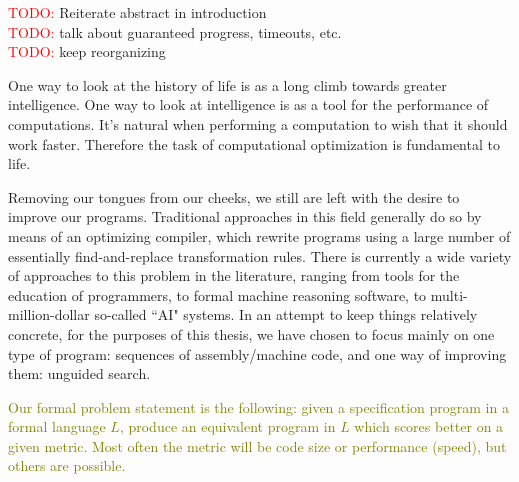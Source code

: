 \documentclass[12pt,twoside]{reedthesis}
\newcommand{\red}[1]{\textcolor{red}{#1}}
\newcommand{\green}[1]{\textcolor{olive}{#1}}
\begin{document}
        \red{TODO:} Reiterate abstract in introduction
     \\ \red{TODO:} talk about guaranteed progress, timeouts, etc.
     \\ \red{TODO:} keep reorganizing
    
    One way to look at the history of life is as a long climb towards greater intelligence.
    One way to look at intelligence is as a tool for the performance of computations.
    It's natural when performing a computation to wish that it should work faster.
    Therefore the task of computational optimization is fundamental to life.
    
    Removing our tongues from our cheeks, we still are left with the desire to improve our programs. 
    Traditional approaches in this field generally do so by means of an optimizing compiler, which rewrite programs using a large number of essentially find-and-replace transformation rules.
    There is currently a wide variety of approaches to this problem in the literature, ranging from tools for the education of programmers, to formal machine reasoning software, to multi-million-dollar so-called ``AI" systems.
    In an attempt to keep things relatively concrete, for the purposes of this thesis, we have chosen to focus mainly on one type of program: sequences of assembly/machine code, and one way of improving them: unguided search.
    
    \green{
    Our formal problem statement is the following: given a specification program in a formal language $L$, produce an equivalent program in $L$ which scores better on a given metric.
    Most often the metric will be code size or performance (speed), but others are possible.
    }
    
\end{document}
